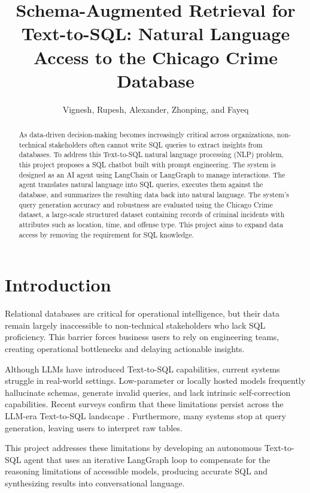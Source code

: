 \documentclass{article}
\title{Schema-Augmented Retrieval for Text-to-SQL: Natural Language Access to the Chicago Crime Database}
\author{Vignesh, Rupesh, Alexander, Zhonping, and Fayeq}
\date{}
\begin{document}
\maketitle

\begin{abstract}
As data-driven decision-making becomes increasingly critical across organizations, non-technical stakeholders often cannot write SQL queries to extract insights from databases. To address this Text-to-SQL natural language processing (NLP) problem, this project proposes a SQL chatbot built with prompt engineering. The system is designed as an AI agent using LangChain or LangGraph to manage interactions. The agent translates natural language into SQL queries, executes them against the database, and summarizes the resulting data back into natural language. The system's query generation accuracy and robustness are evaluated using the Chicago Crime dataset, a large-scale structured dataset containing records of criminal incidents with attributes such as location, time, and offense type. This project aims to expand data access by removing the requirement for SQL knowledge.
\end{abstract}

\section{Introduction}

Relational databases are critical for operational intelligence, but their data remain largely inaccessible to non-technical stakeholders who lack SQL proficiency. This barrier forces business users to rely on engineering teams, creating operational bottlenecks and delaying actionable insights.

Although LLMs have introduced Text-to-SQL capabilities, current systems struggle in real-world settings. Low-parameter or locally hosted models frequently hallucinate schemas, generate invalid queries, and lack intrinsic self-correction capabilities. Recent surveys confirm that these limitations persist across the LLM-era Text-to-SQL landscape \cite{qin2022survey, liu2024survey, shi2024survey}. Furthermore, many systems stop at query generation, leaving users to interpret raw tables.

This project addresses these limitations by developing an autonomous Text-to-SQL agent that uses an iterative LangGraph loop to compensate for the reasoning limitations of accessible models, producing accurate SQL and synthesizing results into conversational language.
\end{document}
